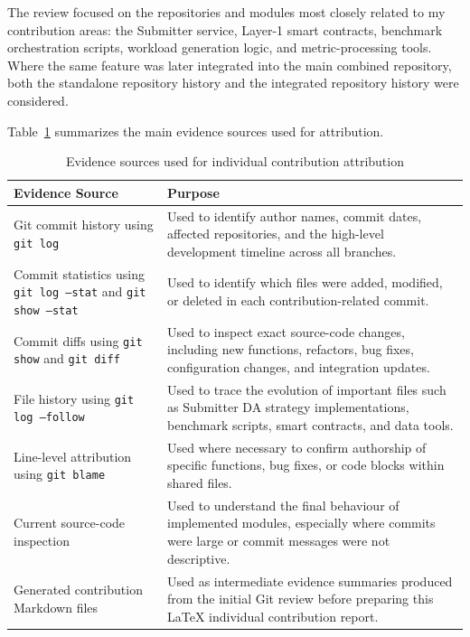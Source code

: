 The review focused on the repositories and modules most closely related to my contribution areas: the Submitter service, Layer-1 smart contracts, benchmark orchestration scripts, workload generation logic, and metric-processing tools. Where the same feature was later integrated into the main combined repository, both the standalone repository history and the integrated repository history were considered.

Table~\ref{tab:evidence_sources} summarizes the main evidence sources used for attribution.

\begin{table}[!htbp]
\centering
\caption{Evidence sources used for individual contribution attribution}
\label{tab:evidence_sources}
\begin{tabularx}{\textwidth}{|p{}|X|}
\hline
\textbf{Evidence Source} & \textbf{Purpose} \\ \hline

Git commit history using \texttt{git log} &
Used to identify author names, commit dates, affected repositories, and the high-level development timeline across all branches. \\ \hline

Commit statistics using \texttt{git log --stat} and \texttt{git show --stat} &
Used to identify which files were added, modified, or deleted in each contribution-related commit. \\ \hline

Commit diffs using \texttt{git show} and \texttt{git diff} &
Used to inspect exact source-code changes, including new functions, refactors, bug fixes, configuration changes, and integration updates. \\ \hline

File history using \texttt{git log --follow} &
Used to trace the evolution of important files such as Submitter DA strategy implementations, benchmark scripts, smart contracts, and data tools. \\ \hline

Line-level attribution using \texttt{git blame} &
Used where necessary to confirm authorship of specific functions, bug fixes, or code blocks within shared files. \\ \hline

Current source-code inspection &
Used to understand the final behaviour of implemented modules, especially where commits were large or commit messages were not descriptive. \\ \hline

Generated contribution Markdown files &
Used as intermediate evidence summaries produced from the initial Git review before preparing this LaTeX individual contribution report. \\ \hline

\end{tabularx}
\end{table}

